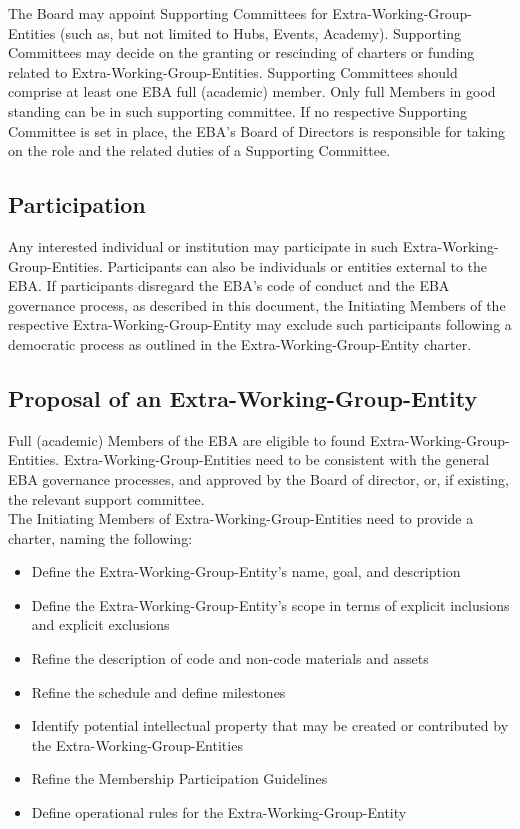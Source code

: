 \documentclass{article}
\begin{document}
The Board may appoint Supporting Committees for Extra-Working-Group-Entities (such as, but not limited to Hubs, Events, Academy). 
Supporting Committees may decide on the granting or rescinding of  charters or funding related to Extra-Working-Group-Entities. 
Supporting Committees should comprise at least one EBA full (academic) member. 
Only full Members in good standing can be in such supporting committee. 
If no respective Supporting Committee is set in place, the EBA’s  Board of Directors is responsible for taking on the role and the related duties of a Supporting Committee.

\subsection{Participation}

Any interested individual or institution may participate in such Extra-Working-Group-Entities. 
Participants can also be individuals or entities external to the EBA. If participants disregard the EBA’s code of conduct and the EBA governance process, as described in this document, the Initiating Members of the respective Extra-Working-Group-Entity may exclude such participants following a democratic process as outlined in the Extra-Working-Group-Entity charter.

\subsection{Proposal of an Extra-Working-Group-Entity}

Full (academic) Members of the EBA are eligible to found Extra-Working-Group-Entities. 
Extra-Working-Group-Entities need to be consistent with the general EBA governance processes, and approved by the Board of director, or, if existing, the relevant support committee. \\
The Initiating Members of Extra-Working-Group-Entities need to provide a charter, naming  the following: \\

\begin{itemize}
	\item Define the Extra-Working-Group-Entity’s name, goal, and description
	\item Define the Extra-Working-Group-Entity’s scope in terms of explicit inclusions and explicit exclusions
	\item Refine the description of code and non-code materials and assets
	\item Refine the schedule and define milestones
	\item Identify potential intellectual property that may be created or contributed by the Extra-Working-Group-Entities
	\item Refine the Membership Participation Guidelines
	\item Define operational rules for the Extra-Working-Group-Entity
\end{itemize}
\end{document}
